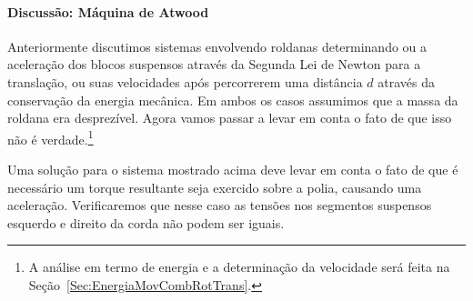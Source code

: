 \pagebreak
\paragraph{Discussão: Máquina de Atwood}

Anteriormente discutimos sistemas envolvendo roldanas determinando ou a aceleração dos blocos suspensos através da Segunda Lei de Newton para a translação, ou suas velocidades após percorrerem uma distância $d$ através da conservação da energia mecânica. Em ambos os casos assumimos que a massa da roldana era desprezível. Agora vamos passar a levar em conta o fato de que isso não é verdade.\footnote[][-2cm]{A análise em termo de energia e a determinação da velocidade será feita na Seção~\ref{Sec:EnergiaMovCombRotTrans}.}

\begin{marginfigure}
\centering
{}
\caption{Uma solução para o sistema mostrado acima deve levar em conta o fato de que é necessário um torque resultante seja exercido sobre a polia, causando uma aceleração. Verificaremos que nesse caso as tensões nos segmentos suspensos esquerdo e direito da corda não podem ser iguais. \label{Fig:MaquinaDeAtwoodComPolia}}
\end{marginfigure}

